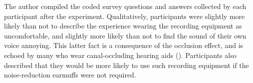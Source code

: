 The author compiled the coded survey questions %
and answers collected by each participant after the experiment. %
Qualitatively, participants were slightly more likely than not to describe the experience wearing the recording equipment as uncomfortable, and slightly more likely than not to find the sound of their own voice annoying.  This latter fact is a consequence of the occlusion effect, and is echoed by many who wear canal-occluding hearing aids (\cite{hansen:97a}).  Participants also described that they would be more likely to use such recording equipment if the noise-reduction earmuffs were not required.


